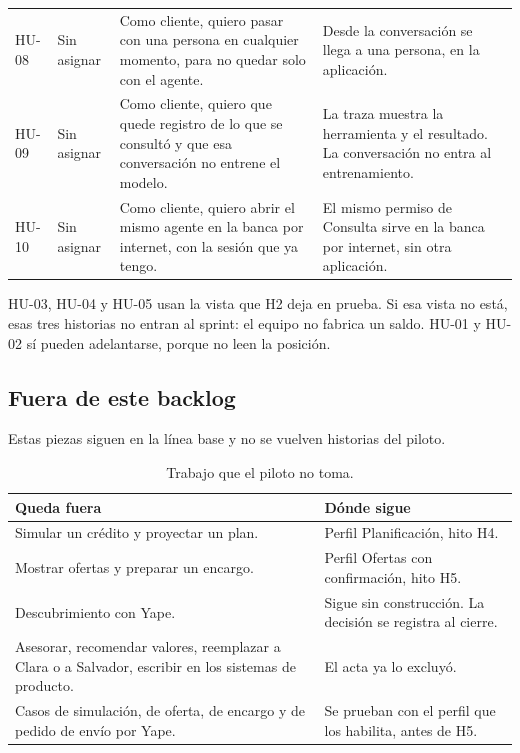 \documentclass[11pt,a4paper]{article}
\begin{document}
\begin{table}[H]
\begin{tabularx}{\textwidth}{@{}l >{\raggedright\arraybackslash}p{2.15cm} >{\raggedright\arraybackslash}X >{\raggedright\arraybackslash}X@{}}
HU-08 & Sin asignar & Como cliente, quiero pasar con una persona en cualquier momento, para no quedar solo con el agente. & Desde la conversación se llega a una persona, en la aplicación. \\
HU-09 & Sin asignar & Como cliente, quiero que quede registro de lo que se consultó y que esa conversación no entrene el modelo. & La traza muestra la herramienta y el resultado. La conversación no entra al entrenamiento. \\
HU-10 & Sin asignar & Como cliente, quiero abrir el mismo agente en la banca por internet, con la sesión que ya tengo. & El mismo permiso de Consulta sirve en la banca por internet, sin otra aplicación. \\
\bottomrule
\end{tabularx}
\end{table}

HU-03, HU-04 y HU-05 usan la vista que H2 deja en prueba. Si esa vista no está, esas tres historias no entran al sprint: el equipo no fabrica un saldo. HU-01 y HU-02 sí pueden adelantarse, porque no leen la posición.

\subsection{Fuera de este backlog}

Estas piezas siguen en la línea base y no se vuelven historias del piloto.

\begin{table}[H]
\centering
\caption{Trabajo que el piloto no toma.}
\small
\begin{tabularx}{\textwidth}{@{}X X@{}}
\toprule
\textbf{Queda fuera} & \textbf{Dónde sigue} \\
\midrule
Simular un crédito y proyectar un plan. & Perfil Planificación, hito H4. \\
Mostrar ofertas y preparar un encargo. & Perfil Ofertas con confirmación, hito H5. \\
Descubrimiento con Yape. & Sigue sin construcción. La decisión se registra al cierre. \\
Asesorar, recomendar valores, reemplazar a Clara o a Salvador, escribir en los sistemas de producto. & El acta ya lo excluyó. \\
Casos de simulación, de oferta, de encargo y de pedido de envío por Yape. & Se prueban con el perfil que los habilita, antes de H5. \\
\bottomrule
\end{tabularx}
\end{table}
\end{document}
